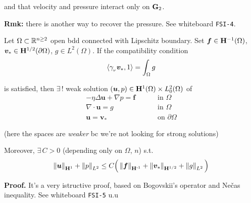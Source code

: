 and that velocity and pressure interact only on $\mathbf{G}_2$.

\smallskip

\textbf{\color{lavender(floral)}Rmk:} there is another way to recover the pressure. See whiteboard \texttt{FSI-4}.

\noindent\rlap{\rule[1.5ex]{0.495\textwidth}{.2pt}}

\vspace{-0.5em}


Let $\Omega\subset\mathbb{R}^{n\geq 2}$ open bdd connected with Lipschitz boundary. Set $\bm f\in\mathbf{H}^{-1}(\Omega)$, $\bm v_*\in \mathbf{H}^{1/2}(\partial\Omega)$, $g\in L^2(\Omega)$. If the compatibility condition
\begin{equation*}
\left\langle \gamma_{_\nu}\bm v_*,1 \right\rangle=\int_\Omega g
\end{equation*}

is satisfied, then $\exists\,!$ weak solution $(\bm u,p)\in \mathbf{H}^1(\Omega)\times L^2_0(\Omega)$ of
\begin{align*}[left=\empheqlbrace]
-\eta\Delta \bm u +\nabla p = \bm f &\qquad\text{ in }\Omega \nonumber \\
\nabla\cdot \bm u=g &\qquad\text{ in }\Omega \nonumber \\
\bm u=\bm v_* &\qquad\text{ on }\partial\Omega \nonumber
\end{align*}

(here the spaces are \emph{weaker} bc we're not looking for strong solutions)

\smallskip

Moreover, $\exists\,C>0$ (depending only on $\Omega$, $n$) s.t.
\begin{equation*}
\left\lVert \bm u \right\rVert_{\mathbf{H}^1}+\left\lVert p \right\rVert_{L^2}\leq C \Big( \left\lVert \bm f \right\rVert_{\mathbf{H}^{\text{-}1}}+\left\lVert \bm v_* \right\rVert_{\mathbf{H}^{1/2}} + \left\lVert g \right\rVert_{L^2} \Big)
\end{equation*}

\textbf{\color{lavender(floral)}Proof.} It's a very istructive proof, based on Bogovskii's operator and Nečas inequality. See whiteboard \texttt{FSI-5} u.u

\noindent\rlap{\rule[1.5ex]{0.495\textwidth}{.2pt}}

\newpage



